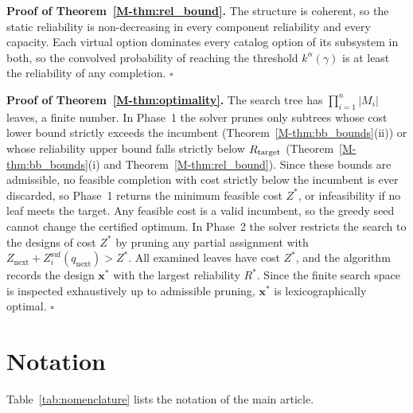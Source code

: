 \documentclass[11pt]{article}
\newcommand{\kag}{k^{\alpha}(\gamma)}\newcommand{\WS}{\tilde{W}_S}\newcommand{\Zsuf}{Z^{\mathrm{suf}}}
\begin{document}
\textbf{Proof of Theorem~\ref*{M-thm:rel_bound}.} The structure is coherent, so the static reliability is
non-decreasing in every component reliability and every capacity. Each virtual option dominates every catalog
option of its subsystem in both, so the convolved probability of reaching the threshold $\kag$ is at least the
reliability of any completion. $\square$

\textbf{Proof of Theorem~\ref*{M-thm:optimality}.} The search tree has $\prod_{i=1}^{n} |M_i|$ leaves, a finite
number. In Phase~1 the solver prunes only subtrees whose cost lower bound strictly exceeds the incumbent
(Theorem~\ref*{M-thm:bb_bounds}(ii)) or whose reliability upper bound falls strictly below $R_{\mathrm{target}}$
(Theorem~\ref*{M-thm:bb_bounds}(i) and Theorem~\ref*{M-thm:rel_bound}). Since these bounds are admissible, no
feasible completion with cost strictly below the incumbent is ever discarded, so Phase~1 returns the minimum
feasible cost $Z^*$, or infeasibility if no leaf meets the target. Any feasible cost is a valid incumbent, so the
greedy seed cannot change the certified optimum. In Phase~2 the solver restricts the search to the designs of
cost $Z^*$ by pruning any partial assignment with $Z_{\mathrm{next}} + \Zsuf_i(q_{\mathrm{next}}) > Z^*$. All
examined leaves have cost $Z^*$, and the algorithm records the design $\mathbf{x}^*$ with the largest
reliability $R^*$. Since the finite search space is inspected exhaustively up to admissible pruning,
$\mathbf{x}^*$ is lexicographically optimal. $\square$

\section{Notation} \label{sec:supp_notation}
Table~\ref{tab:nomenclature} lists the notation of the main article.
\end{document}
